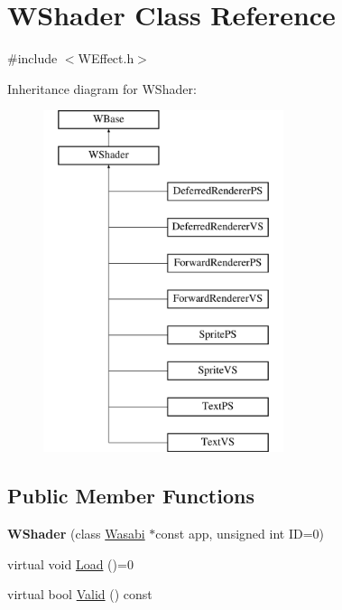 \hypertarget{class_w_shader}{}\section{W\+Shader Class Reference}
\label{class_w_shader}


{\ttfamily \#include $<$W\+Effect.\+h$>$}

Inheritance diagram for W\+Shader\+:\begin{figure}[H]
\begin{center}
\leavevmode
\includegraphics[height=10.000000cm]{class_w_shader}
\end{center}
\end{figure}
\subsection*{Public Member Functions}
\begin{DoxyCompactItemize}
\item 
{\bfseries W\+Shader} (class \hyperlink{class_wasabi}{Wasabi} $\ast$const app, unsigned int ID=0)\hypertarget{class_w_shader_aa47ebd4f94586e3b030d16a549849568}{}\label{class_w_shader_aa47ebd4f94586e3b030d16a549849568}

\item 
virtual void \hyperlink{class_w_shader_a7ce478193bc1676b1a7fdd741bdb32aa}{Load} ()=0
\item 
virtual bool \hyperlink{class_w_shader_a04a739bdfc8524c6d5aa14353c0e3f99}{Valid} () const 
\end{DoxyCompactItemize}
